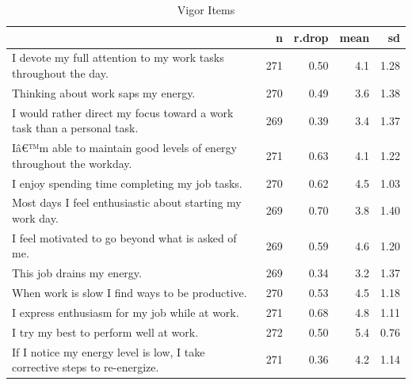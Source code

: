 \documentclass[
]{book}
\begin{document}
\begin{table}

\caption{\label{tab:rdrop5}Vigor Items}
\centering
\begin{tabular}[t]{l|r|r|r|r}
\hline
  & n & r.drop & mean & sd\\
\hline
I devote my full attention to my work tasks throughout the day. & 271 & 0.50 & 4.1 & 1.28\\
\hline
Thinking about work saps my energy. & 270 & 0.49 & 3.6 & 1.38\\
\hline
I would rather direct my focus toward a work task than a personal task. & 269 & 0.39 & 3.4 & 1.37\\
\hline
Iâ€™m able to maintain good levels of energy throughout the workday. & 271 & 0.63 & 4.1 & 1.22\\
\hline
I enjoy spending time completing my job tasks. & 270 & 0.62 & 4.5 & 1.03\\
\hline
Most days I feel enthusiastic about starting my work day. & 269 & 0.70 & 3.8 & 1.40\\
\hline
I feel motivated to go beyond what is asked of me. & 269 & 0.59 & 4.6 & 1.20\\
\hline
This job drains my energy. & 269 & 0.34 & 3.2 & 1.37\\
\hline
When work is slow I find ways to be productive. & 270 & 0.53 & 4.5 & 1.18\\
\hline
I express enthusiasm for my job while at work. & 271 & 0.68 & 4.8 & 1.11\\
\hline
I try my best to perform well at work. & 272 & 0.50 & 5.4 & 0.76\\
\hline
If I notice my energy level is low, I take corrective steps to re-energize. & 271 & 0.36 & 4.2 & 1.14\\
\hline
\end{tabular}
\end{table}
\end{document}
